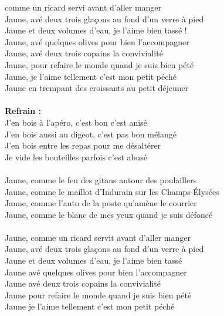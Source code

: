 
 comme un ricard servi avant d'aller manger
\\Jaune, avé deux trois glaçons au fond d'un verre à pied
\\Jaune et deux volumes d'eau, je l'aime bien tassé !
\\Jaune, avé quelques olives pour bien l'accompagner
\\Jaune, avé deux trois copains la convivialité
\\Jaune, pour refaire le monde quand je suis bien pété
\\Jaune, je l'aime tellement c'est mon petit péché
\\Jaune en trempant des croissants au petit déjeuner
\\\\\textbf{Refrain :}
\\J'en bois à l'apéro, c'est bon c'est anisé
\\J'en bois aussi au digeot, c'est pas bon mélangé
\\J'en bois entre les repas pour me désaltérer
\\Je vide les bouteilles parfois c'est abusé
\\\\Jaune, comme le feu des gitans autour des poulaillers
\\Jaune, comme le maillot d'Indurain sur les Champs-Élysées
\\Jaune, comme l'auto de la poste qu'amène le courrier
\\Jaune, comme le blanc de mes yeux quand je suis défoncé
\\\\Jaune, comme un ricard servit avant d'aller manger
\\Jaune, avé deux trois glaçons au fond d'un verre à pied
\\Jaune et deux volumes d'eau, je l'aime bien tassé
\\Jaune avé quelques olives pour bien l'accompagner
\\Jaune avé deux trois copains la convivialité
\\Jaune pour refaire le monde quand je suis bien pété
\\Jaune je l'aime tellement c'est mon petit péché
